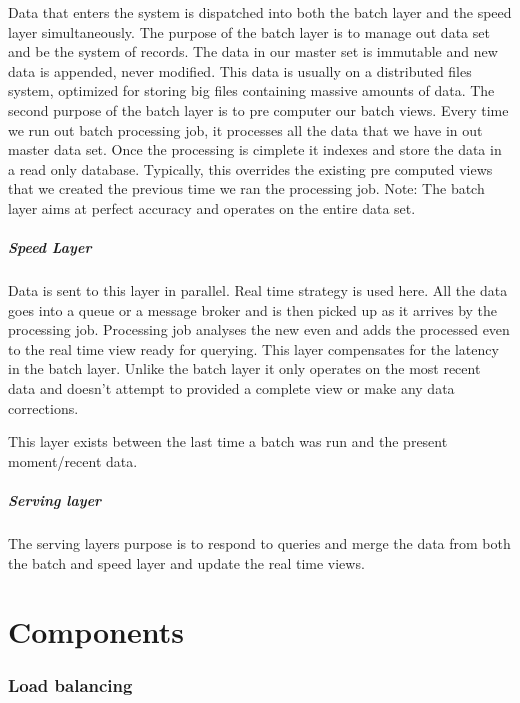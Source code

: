 \documentclass[a4paper, 11pt]{book}
\begin{document}
    Data that enters the system is dispatched into both the batch layer and the speed layer simultaneously.
    The purpose of the batch layer is to manage out data set and be the system of records.
    The data in our master set is immutable and new data is appended, never modified.
    This data is usually on a distributed files system, optimized for storing big files containing massive amounts of data.
    The second purpose of the batch layer is to pre computer our batch views.
    Every time we run out batch processing job, it processes all the data that we have in out master data set.
    Once the processing is cimplete it indexes and store the data in a read only database.
    Typically, this overrides the existing pre computed views that we created the previous time we ran the processing job.
    Note: The batch layer aims at perfect accuracy and operates on the entire data set.

    \paragraph{Speed Layer}
    Data is sent to this layer in parallel.
    Real time strategy is used here.
    All the data goes into a queue or a message broker and is then picked up as it arrives by the processing job.
    Processing job analyses the new even and adds the processed even to the real time view ready for querying.
    This layer compensates for the latency in the batch layer.
    Unlike the batch layer it only operates on the most recent data and doesn't attempt to provided a complete view or make any data corrections.

    This layer exists between the last time a batch was run and the present moment/recent data.

    \paragraph{Serving layer}
    The serving layers purpose is to respond to queries and merge the data from both the batch and speed layer and update the real time views.


    \chapter{Components}

    \subsection{Load balancing}
\end{document}
